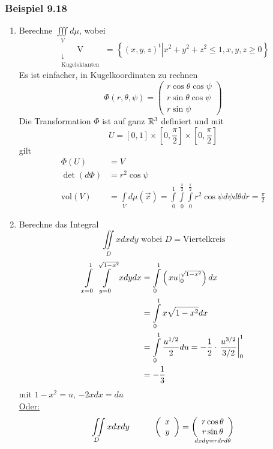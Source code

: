 \subsubsection*{Beispiel 9.18}
\begin{enumerate}
\item Berechne $\iiint\limits_V d\mu$, wobei \[\mathop {\text{V}}\limits_{\begin{array}{*{20}{c}}
 \downarrow \\
{{\text{Kugeloktanten}}}
\end{array}} {\text{ = }}\left\{ {\left. {{{\left( {x,y,z} \right)}^t}} \right|{x^2} + {y^2} + {z^2} \le 1,x,y,z \ge 0} \right\}\] Es ist einfacher, in Kugelkoordinaten zu rechnen
\[\Phi \left( {r,\theta ,\psi } \right) = \left( {\begin{array}{*{20}{c}}
{r\cos \theta \cos \psi }\\
{r\sin \theta \cos \psi }\\
{r\sin \psi }
\end{array}} \right)\]
Die Transformation $\Phi$ ist auf ganz $\mathbb{R}^3$ definiert und mit \[U = \left[ {0,1} \right] \times \left[ {0,\frac{\pi }{2}} \right] \times \left[ {0,\frac{\pi }{2}} \right]\]
gilt
\begin{align*}
\Phi\left( U\right) &=V\\
\det\left( d\Phi\right)&=r^2\cos\psi\\
\text{vol}\left(V\right)&=\int\limits_{V} d\mu\left( \vec x\right)=\int\limits_0^1\int\limits_0^{\frac{\pi}{2}}\int\limits_0^{\frac{\pi}{2}} r^2\cos\psi d\psi d\theta dr=\frac{\pi}{2}
\end{align*}
\item Berechne das Integral
\[ \iint\limits_D x dx dy\text{ wobei $D=$Viertelkreis}\]
\begin{align*}
\int\limits_{x = 0}^1 {\int\limits_{y = 0}^{\sqrt {1 - {x^2}} } x } dydx &=\int\limits_0^1 {\left( {\left. {xu} \right|_0^{\sqrt {1 - {x^2}} }} \right)dx} \\
&=\int\limits_0^1 x\sqrt{1-x^2}dx\\
&=\int\limits_0^1 {\frac{{{u^{{1 \mathord{\left/
 {\vphantom {1 2}} \right.
 \kern-\nulldelimiterspace} 2}}}}}{2}} du =  - \frac{1}{2} \cdot \left. {\frac{{{u^{{3 \mathord{\left/
 {\vphantom {3 2}} \right.
 \kern-\nulldelimiterspace} 2}}}}}{{{3 \mathord{\left/
 {\vphantom {3 2}} \right.
 \kern-\nulldelimiterspace} 2}}}} \right|_0^1\\
&=-\frac{1}{3}
\end{align*}
mit $1-x^2=u$, $-2xdx=du$\\
\underline{Oder:}\\
\[ \iint\limits_D x dx dy \hspace{10mm}\left( {\begin{array}{*{20}{c}}
x\\
y
\end{array}} \right) = \mathop {\left( {\begin{array}{*{20}{c}}
{r\cos \theta }\\
{r\sin \theta }
\end{array}} \right)}\limits_{dxdy = rdrd\theta } \]


\end{enumerate}
